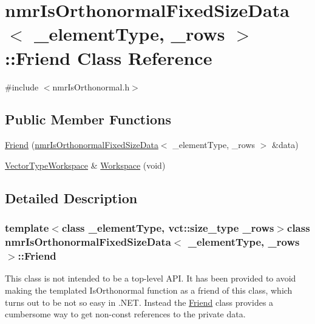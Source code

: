 \hypertarget{classnmr_is_orthonormal_fixed_size_data_1_1_friend}{}\section{nmr\+Is\+Orthonormal\+Fixed\+Size\+Data$<$ \+\_\+element\+Type, \+\_\+rows $>$\+:\+:Friend Class Reference}
\label{classnmr_is_orthonormal_fixed_size_data_1_1_friend}


{\ttfamily \#include $<$nmr\+Is\+Orthonormal.\+h$>$}

\subsection*{Public Member Functions}
\begin{DoxyCompactItemize}
\item 
\hyperlink{classnmr_is_orthonormal_fixed_size_data_1_1_friend_a8e272eb3a07d60b6a350cfcaabff3acd}{Friend} (\hyperlink{classnmr_is_orthonormal_fixed_size_data}{nmr\+Is\+Orthonormal\+Fixed\+Size\+Data}$<$ \+\_\+element\+Type, \+\_\+rows $>$ \&data)
\item 
\hyperlink{classnmr_is_orthonormal_fixed_size_data_a9c2423d8da4e6400b83e1425454bbbe3}{Vector\+Type\+Workspace} \& \hyperlink{classnmr_is_orthonormal_fixed_size_data_1_1_friend_aec2006550f76ba340048e60db7abb431}{Workspace} (void)
\end{DoxyCompactItemize}


\subsection{Detailed Description}
\subsubsection*{template$<$class \+\_\+element\+Type, vct\+::size\+\_\+type \+\_\+rows$>$class nmr\+Is\+Orthonormal\+Fixed\+Size\+Data$<$ \+\_\+element\+Type, \+\_\+rows $>$\+::\+Friend}

This class is not intended to be a top-\/level A\+P\+I. It has been provided to avoid making the templated Is\+Orthonormal function as a friend of this class, which turns out to be not so easy in .N\+E\+T. Instead the \hyperlink{classnmr_is_orthonormal_fixed_size_data_1_1_friend}{Friend} class provides a cumbersome way to get non-\/const references to the private data. 

